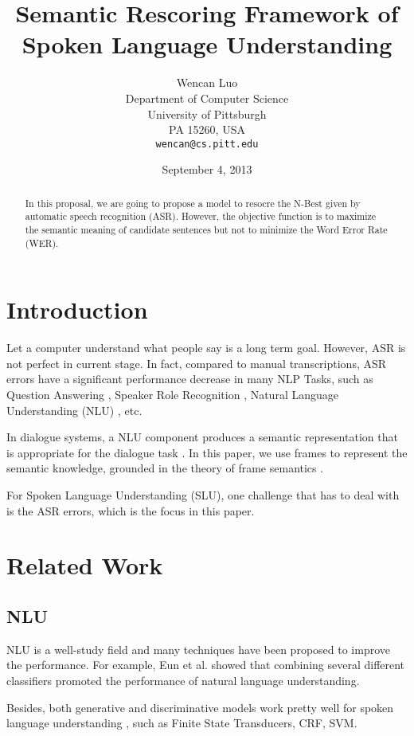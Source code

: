 \documentclass[11pt,letterpaper]{article}
\title{Semantic Rescoring Framework of Spoken Language Understanding}
\author{Wencan Luo\\
	    Department of Computer Science\\
	    University of Pittsburgh\\
	    PA 15260, USA\\
	    {\tt wencan@cs.pitt.edu}
	  }
\date{September 4, 2013}
\begin{document}
\maketitle
\begin{abstract}
In this proposal, we are going to propose a model to resocre the N-Best given by automatic speech recognition (ASR).
However, the objective function is to maximize the semantic meaning of candidate sentences but not to minimize the Word Error Rate (WER).

\end{abstract}

\section{Introduction}
Let a computer understand what people say is a long term goal. However, ASR is not perfect in current stage. 
In fact, compared to manual transcriptions, ASR errors have a significant performance decrease in many NLP Tasks, such as Question Answering \cite{Turmo:2007}, Speaker Role Recognition \cite{Garg:2008}, Natural Language Understanding (NLU) \cite{Raymond:2007}, etc.

In dialogue systems, a NLU component produces a semantic representation that is appropriate for the dialogue task \cite{Jurafsky:2000}. In this paper, we use frames to represent the semantic knowledge, grounded in the theory of frame semantics \cite{Fillmore:1982}.

For Spoken Language Understanding (SLU), one challenge that has to deal with is the ASR errors, which is the focus in this paper.

\section{Related Work}
\subsection{NLU}

NLU is a well-study field and many techniques have been proposed to improve the performance. For example, Eun et al. showed that combining several different classifiers promoted the performance of natural language understanding. 
 
Besides, both generative and discriminative models work pretty well for spoken language understanding \cite{Raymond:2007}, such as Finite State Transducers, CRF, SVM.
 
\end{document}
